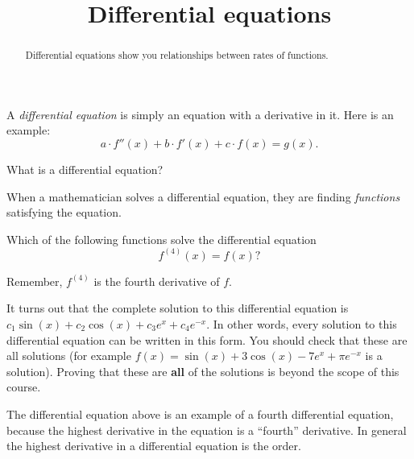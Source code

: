 \documentclass{ximera}
\title[Dig-In:]{Differential equations}
\begin{document}
\begin{abstract}
  Differential equations show you relationships between rates of
  functions.
\end{abstract}
\maketitle

A \textit{differential equation} is
simply an equation with a derivative in it. Here is an example:
\[
a\cdot f''(x) + b\cdot f'(x) + c\cdot f(x) = g(x). 
\]
\begin{question}
  What is a differential equation?
  \begin{multipleChoice}
  \end{multipleChoice}
\end{question}

When a mathematician solves a differential equation, they are finding
\textit{functions} satisfying the equation.
\begin{question}
  Which of the following functions solve the differential equation
  \[
  f^{(4)}(x) = f(x)?
  \]
  \begin{hint}
    Remember, $f^{(4)}$ is the fourth derivative of $f$.
  \end{hint}
  \begin{selectAll}
  \end{selectAll}
  \begin{feedback}
    It turns out that the complete solution to this differential equation
    is $c_1\sin(x)+c_2\cos(x)+c_3e^x+c_4e^{-x}$.  In other words, every
    solution to this differential equation can be written in this form.
    You should check that these are all solutions (for example $f(x) =
    \sin(x)+3\cos(x)-7e^x+\pi e^{-x}$ is a solution).  Proving that these
    are \textbf{all} of the solutions is beyond the scope of this course.
  \end{feedback}
\end{question}


The differential equation above is an example of a fourth 
differential equation, because the highest derivative in the equation
is a ``fourth'' derivative. In general the highest derivative in a
differential equation is the order.
\end{document}
